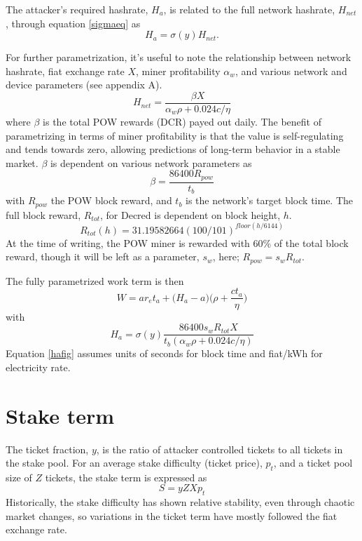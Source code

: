 \documentclass[a4paper,12pt]{article}
\begin{document}
The attacker's required hashrate, $ H_a $, is related to the full network hashrate,  $H_{net}$, through equation \ref{sigmaeq} as 
%
\begin{equation}
H_a = \sigma(y)H_{net}.
\end{equation}
 

For further parametrization, it's useful to note the relationship between network hashrate, fiat exchange rate $ X $, miner profitability $ \alpha_w $, and various network and device parameters (see appendix A).
%
\begin{equation}
H_{net} = \frac{ \beta X }{ \alpha_w \rho + 0.024 c / \eta  }
\end{equation}
%
where $\beta$ is the total POW rewards (DCR) payed out daily. The benefit of parametrizing in terms of miner profitability is that the value is self-regulating and tends towards zero, allowing predictions of long-term behavior in a stable market. $\beta$ is dependent on various network parameters as
%
\begin{equation}
\beta = \frac{ 86400 R_{pow} }{ t_b } 
\end{equation}
%
with $R_{pow}$ the POW block reward, and $t_b$ is the network's target block time. The full block reward, $R_{tot}$, for Decred is dependent on block height, $h$.
%
\begin{equation}
R_{tot}(h) = 31.19582664(100/101)^{floor(h/6144)}
\end{equation}
%
At the time of writing, the POW miner is rewarded with 60\% of the total block reward, though it will be left as a parameter, $ s_w $, here; $R_{pow} = s_w R_{tot}$. 

The fully parametrized work term is then 
%
\begin{equation}
W = ar_et_a +\Big( H_a - a \Big) \Big(\rho + \frac{ c t_a }{ \eta } \Big)
\end{equation}
%
with
%
%
\begin{equation}
\label{hafig}
H_a = \sigma(y) \frac{ 86400 s_w R_{tot} X }{ t_b (\alpha_w \rho + 0.024 c / \eta) }
\end{equation}
%
Equation \ref{hafig} assumes units of seconds for block time and fiat/kWh for electricity rate.


\section{Stake term}

The ticket fraction, $y$, is the ratio of attacker controlled tickets to all tickets in the stake pool. For an average stake difficulty (ticket price), $ p_t $, and a ticket pool size of $ Z $ tickets, the stake term is expressed as 
%
\begin{equation}
S = yZXp_t
\end{equation}
%
Historically, the stake difficulty has shown relative stability, even through chaotic market changes, so variations in the ticket term have mostly followed the fiat exchange rate. 
\end{document}
